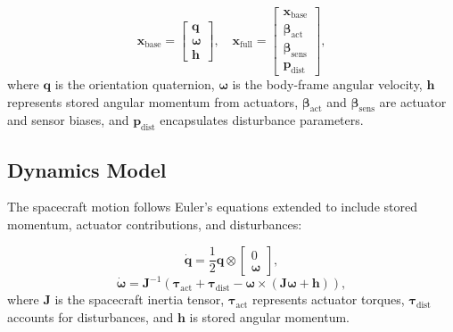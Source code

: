 \documentclass[conference]{IEEEtran}
\begin{document}
\begin{equation}
\mathbf{x}_{\text{base}} =
\begin{bmatrix}
\mathbf{q} \\
\boldsymbol{\omega} \\
\mathbf{h}
\end{bmatrix}, \quad
\mathbf{x}_{\text{full}} =
\begin{bmatrix}
\mathbf{x}_{\text{base}} \\
\boldsymbol{\beta}_{\text{act}} \\
\boldsymbol{\beta}_{\text{sens}} \\
\mathbf{p}_{\text{dist}}
\end{bmatrix},
\end{equation}
where $\mathbf{q}$ is the orientation quaternion, $\boldsymbol{\omega}$ is the body-frame angular velocity, $\mathbf{h}$ represents stored angular momentum from actuators, $\boldsymbol{\beta}_{\text{act}}$ and $\boldsymbol{\beta}_{\text{sens}}$ are actuator and sensor biases, and $\mathbf{p}_{\text{dist}}$ encapsulates disturbance parameters.

\subsection{Dynamics Model}\label{subsec:dynamics}

The spacecraft motion follows Euler's equations extended to include stored momentum, actuator contributions, and disturbances:

\begin{equation}
\dot{\mathbf{q}} = \frac{1}{2} \mathbf{q} \otimes
\begin{bmatrix}
0 \\
\boldsymbol{\omega}
\end{bmatrix},
\end{equation}
\begin{equation}\label{eq:euler}
\dot{\boldsymbol{\omega}} = \mathbf{J}^{-1} \left(
\boldsymbol{\tau}_{\text{act}} + \boldsymbol{\tau}_{\text{dist}} - \boldsymbol{\omega} \times (\mathbf{J} \boldsymbol{\omega} + \mathbf{h})
\right),
\end{equation}
where $\mathbf{J}$ is the spacecraft inertia tensor, $\boldsymbol{\tau}_{\text{act}}$ represents actuator torques, $\boldsymbol{\tau}_{\text{dist}}$ accounts for disturbances, and $\mathbf{h}$ is stored angular momentum.
\end{document}
